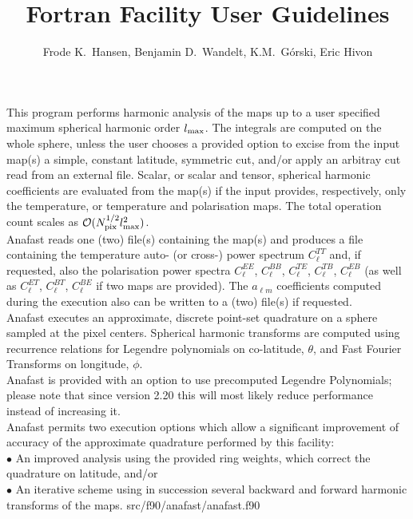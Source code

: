 
\sloppy


\title{\healpix Fortran Facility User Guidelines}
 \section[anafast]{\nosectionname}
\label{fac:anafast}
\author{Frode K.~Hansen, Benjamin D.~Wandelt, K.M.~G\'orski, Eric Hivon}

\begin{facility}
{This program performs harmonic analysis of the \healpix maps 
up to a user
specified maximum spherical harmonic order $l_{\mathrm{max}}$.
The integrals are computed on the whole sphere, unless the user 
chooses  a provided option 
to excise from the input map(s) a simple, constant latitude, symmetric cut, and/or
apply an arbitray cut read from an external file.
Scalar, or scalar and tensor, spherical harmonic coefficients are evaluated
from the map(s) if the input provides, respectively, only the temperature,
or temperature and polarisation maps.
The total operation count scales as 
${\cal {O}}(N_{\mathrm{pix}}^{1/2}l_{\mathrm{max}}^2 )$. %
\\ %
Anafast reads one (two) file(s) containing the map(s) and produces 
a file containing the temperature auto- (or cross-) power spectrum
$C^{TT}_\ell$ and, if requested, 
also the polarisation power spectra $C^{EE}_\ell$, $C^{BB}_\ell$, $C^{TE}_\ell$,
$C^{TB}_\ell$, $C^{EB}_\ell$ (as well as  $C^{ET}_\ell$,
$C^{BT}_\ell$, $C^{BE}_\ell$ if two maps are provided).
The $a_{\ell m}$  coefficients computed during the execution also can be  
written to a (two) file(s) if requested. %
\\ %
Anafast executes an approximate, discrete point-set quadrature on 
a sphere
sampled at the \healpix pixel centers.
Spherical harmonic transforms are computed 
using recurrence relations for Legendre polynomials on co-latitude, 
$\theta$, 
and  Fast Fourier Transforms on longitude, $\phi$. %
\\%
Anafast is provided with an option to use precomputed Legendre Polynomials;
please note that since version 2.20 this will most likely reduce performance
instead of increasing it. %
\\%
Anafast permits two execution options 
which allow a significant improvement of accuracy of 
the approximate quadrature performed by this facility:%
\\ %
$\bullet$ An improved analysis using the provided ring weights, 
which correct the quadrature
on latitude, and/or  %
\\%
$\bullet$ An iterative scheme using in 
succession several backward and forward harmonic transforms 
of the maps.}%
{src/f90/anafast/anafast.f90}
\end{facility}


